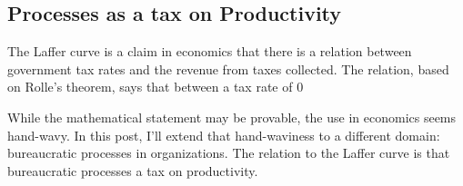 
\subsection{Processes as a tax on Productivity}

The Laffer curve is a claim in economics that there is a relation between government tax rates and the revenue from taxes collected. The relation, based on Rolle's theorem, says that between a tax rate of 0%

While the mathematical statement may be provable, the use in economics seems hand-wavy. In this post, I'll extend that hand-waviness to a different domain: bureaucratic processes in organizations. The relation to the Laffer curve is that bureaucratic processes a tax on productivity. 
